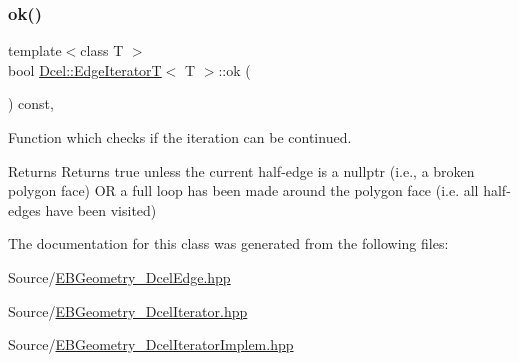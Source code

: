 \subsubsection{\texorpdfstring{ok()}{ok()}}
{\footnotesize\ttfamily template$<$class T $>$ \\
bool \hyperlink{classDcel_1_1EdgeIteratorT}{Dcel\+::\+Edge\+IteratorT}$<$ T $>$\+::ok (\begin{DoxyParamCaption}{ }\end{DoxyParamCaption}) const\hspace{0.3cm}{\ttfamily [inline]}, {\ttfamily [noexcept]}}



Function which checks if the iteration can be continued. 

\begin{DoxyReturn}{Returns}
Returns true unless the current half-\/edge is a nullptr (i.\+e., a broken polygon face) OR a full loop has been made around the polygon face (i.\+e. all half-\/edges have been visited) 
\end{DoxyReturn}


The documentation for this class was generated from the following files\+:\begin{DoxyCompactItemize}
\item 
Source/\hyperlink{EBGeometry__DcelEdge_8hpp}{E\+B\+Geometry\+\_\+\+Dcel\+Edge.\+hpp}\item 
Source/\hyperlink{EBGeometry__DcelIterator_8hpp}{E\+B\+Geometry\+\_\+\+Dcel\+Iterator.\+hpp}\item 
Source/\hyperlink{EBGeometry__DcelIteratorImplem_8hpp}{E\+B\+Geometry\+\_\+\+Dcel\+Iterator\+Implem.\+hpp}\end{DoxyCompactItemize}
